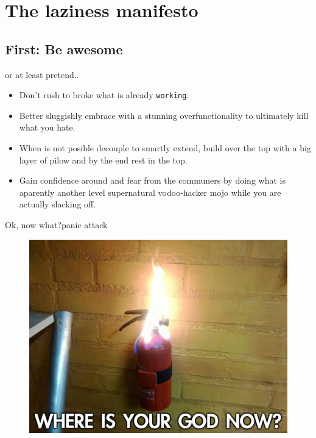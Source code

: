 \section{The laziness manifesto}

\subsection{First: Be awesome}



\begin{frame}{or at least pretend..}{}

  \begin{itemize}
  \item
    Don't rush to broke what is already \texttt{working}.
  \pause
  \item
    Better sluggishly embrace with a stunning overfunctionality to ultimately kill what you hate. 
  \pause
\item
    When is not posible decouple to smartly extend, build over the top with a big layer of pilow  and by the end rest in the top.
  \pause
\item
    Gain confidence around and fear from the communers by doing what is aparently another level supernatural vodoo-hacker mojo while you are actually slacking off.   
  \pause
  \end{itemize}
\end{frame}


\begin{frame}{Ok, now what?}{panic attack}

\begin{figure}[h]
\centering
\includegraphics[scale=0.52]{../images/irony1.jpg}
\end{figure}
 
\end{frame}

